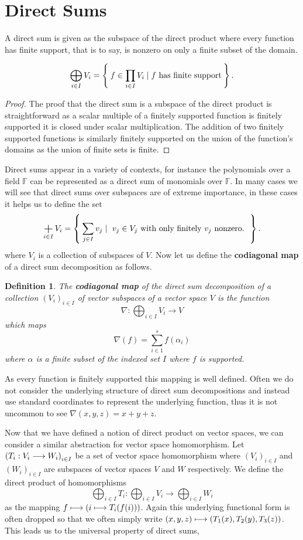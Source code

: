 \documentclass[12pt]{extarticle}
\newtheorem{definition}[theorem]{Definition}
\DeclareMathOperator*{\bigplus}{\scalerel*{+}{\textstyle\sum}}
\renewcommand{\mapsto}[0]{\longmapsto}
\renewcommand{\to}[0]{\longrightarrow}
\newcommand{\F}{{\mathbb{F}}}
\begin{document}
\section{Direct Sums}

A direct sum is given as the subspace of the direct product where every function has finite support, that is to say, is nonzero on only a finite subset of the domain.

\[
  \bigoplus_{i \in I} V_i = \Set{ f \in \prod_{i \in I} V_i \mid \text{$f$ has finite support} }.
\]

\begin{proof}
  The proof that the direct sum is a subspace of the direct product is straightforward as a scalar multiple of a finitely supported function is finitely supported it is closed under scalar multiplication. The addition of two finitely supported functions is similarly finitely supported on the union of the function's domains as the union of finite sets is finite.
\end{proof}

Direct sums appear in a variety of contexts, for instance the polynomials over a field $\F$ can be represented as a direct sum of monomials over $\F$. In many cases we will see that direct sums over subspaces are of extreme importance, in these cases it helps us to define the set 
\[
  \bigplus_{i \in I} V_i = \Set{ \sum_{j \in I} v_j \mid \text{ $v_j \in V_j$ with only finitely $v_j$ nonzero. } }.
\]
where $V_i$ is a collection of subspaces of $V$. Now let us define the \textbf{codiagonal map} of a direct sum decomposition as follows. 

\begin{definition}
  The \textbf{codiagonal map} of the direct sum decomposition of a collection $(V_i)_{i \in I}$ of vector subspaces of a vector space $V$ is the function
  \[
    \nabla: \bigoplus_{i \in I} V_i \to V
  \]
  which maps 
  \[
    \nabla(f) = \sum_{i \in 1}^s f(\alpha_i)
  \]
  where $\alpha$ is a finite subset of the indexed set $I$ where $f$ is supported.
\end{definition}

As every function is finitely supported this mapping is well defined. Often we do not consider the underlying structure of direct sum decompositions and instead use standard coordinates to represent the underlying function, thus it is not uncommon to see $\nabla(x, y, z ) = x + y +z$. 

Now that we have defined a notion of direct product on vector spaces, we can consider a similar abstraction for vector space homomorphism. Let $\qty(T_i : V_i \to W_i)_{i \in I}$ be a set of vector space homomorphism where $(V_i)_{i \in I}$ and $(W_i)_{i \in I}$ are subspaces of vector spaces $V$ and $W$ respectively. We define the direct product of homomorphisms 
\[
  \bigoplus_{i \in I} T_i : \bigoplus_{i \in I} V_i \to \bigoplus_{i \in I} W_i
\]
as the mapping $f \mapsto \qty(i \mapsto T_i(f(i)))$. Again this underlying functional form is often dropped so that we often simply write $(x, y, z) \mapsto \qty(T_1(x), T_2(y), T_3(z))$. This leads us to the universal property of direct sums, 
\end{document}
